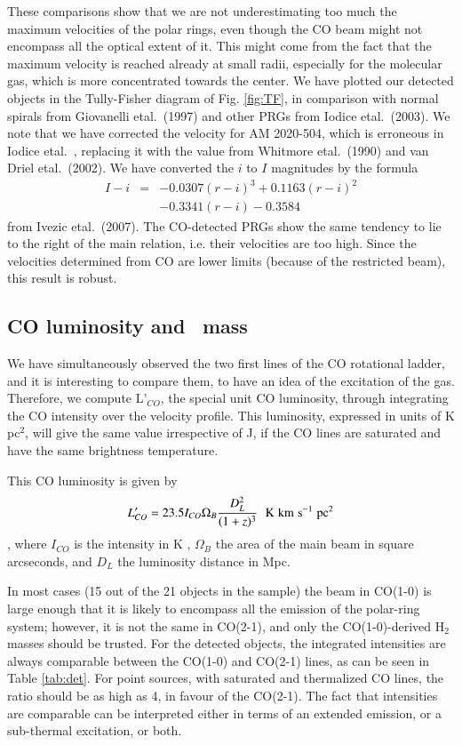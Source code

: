 \documentclass[traditabstract]{aa}
\def\hh     {\ifmmode{{\rm H}_2}\else{H$_2$}\fi}
\def\ts     {\thinspace}
\def\kms    {\ifmmode{{\rm \ts km\ts s}^{-1}}\else{\ts km\ts s$^{-1}$}\fi}
\def\etal   {{\rm et\ts al.}~}
\begin{document}
These comparisons show that we are not underestimating too much
the maximum velocities of the polar rings, even though the CO beam
might not encompass all the optical extent of it. This might come
from the fact that the maximum velocity is reached already at small radii, 
especially for the 
molecular gas, which is more concentrated towards the center.
 We have plotted our detected objects in the Tully-Fisher diagram
of Fig. \ref{fig:TF}, in comparison with normal spirals
from Giovanelli \etal (1997) and other PRGs from Iodice \etal (2003). We note
that we have corrected the velocity for AM 2020-504, which is erroneous in
Iodice \etal, replacing it with the value from Whitmore \etal (1990) and van Driel \etal (2002).
We have converted the $i$ to $I$ magnitudes by the formula
\begin{eqnarray}\nonumber
I-i &=& -0.0307(r-i)^3 +0.1163(r-i)^2 \\ & &
\nonumber
-0.3341(r-i)-0.3584
\end{eqnarray}
from Ivezic \etal (2007).
 The CO-detected PRGs show the same tendency to lie to the right
of the main relation, i.e. their velocities are too high. Since the velocities
determined from CO are lower limits (because of the restricted beam), this result
is robust.


\subsection{CO luminosity and \hh\, mass}
\label{CO-mass}

We have simultaneously observed the two first lines of the CO
rotational ladder, and it is interesting to compare them,
to have an idea of the excitation of the gas.
Therefore, we compute L'$_{CO}$, the special unit CO luminosity,
through integrating the CO intensity over the velocity profile.
  This luminosity, expressed in units of K \kms pc$^2$,
 will give the same value irrespective of  J, if the
CO lines are saturated and have the same brightness temperature.

This CO luminosity is given by $$L'_{CO} =
23.5 I_{CO} \Omega_B {{D_L^2}\over {(1+z)^3}} \hskip6pt \rm{K\hskip3pt
  km \hskip3pt s^{-1}\hskip3pt pc^2}$$,
where  $I_{CO}$ is the intensity in K \kms, $\Omega_B$ the area of
the main beam in square arcseconds, and $D_L$ the luminosity
distance in Mpc.  

In most cases (15 out of the 21 objects in the sample) 
the beam in CO(1-0) is large enough that it is likely to encompass
all the emission of the polar-ring system; however, it is not the same
in CO(2-1), and only the CO(1-0)-derived H$_2$ masses should
be trusted. 
For the detected objects, the integrated intensities are always
comparable between the CO(1-0) and CO(2-1) lines, as can be seen in 
Table \ref{tab:det}. For point sources, with saturated and thermalized CO lines,
the ratio should be as high as 4, in favour of the CO(2-1). The 
fact that intensities are comparable can be interpreted either
in terms of an extended emission, or a sub-thermal excitation, or both.
\end{document}
